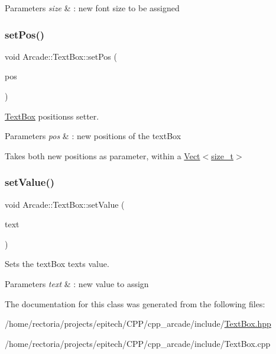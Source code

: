 \begin{DoxyParams}{Parameters}
{\em size} & \+: new font size to be assigned \\
\hline
\end{DoxyParams}
\mbox{\label{class_arcade_1_1_text_box_aec7043b5dc883feed62a8e8eb9dea78d}} 
\subsubsection{\texorpdfstring{set\+Pos()}{setPos()}}
{\footnotesize\ttfamily void Arcade\+::\+Text\+Box\+::set\+Pos (\begin{DoxyParamCaption}\item[{\hyperlink{class_arcade_1_1_vect}{Arcade\+::\+Vect}$<$ size\+\_\+t $>$}]{pos }\end{DoxyParamCaption})}



\hyperlink{class_arcade_1_1_text_box}{Text\+Box} positions\textquotesingle{}s setter. 


\begin{DoxyParams}{Parameters}
{\em pos} & \+: new positions of the text\+Box\\
\hline
\end{DoxyParams}
Takes both new positions as parameter, within a \hyperlink{class_arcade_1_1_vect}{Vect$<$size\+\_\+t$>$} \mbox{\label{class_arcade_1_1_text_box_a195c78d58c25c9f8a810a0ae7450220f}} 
\subsubsection{\texorpdfstring{set\+Value()}{setValue()}}
{\footnotesize\ttfamily void Arcade\+::\+Text\+Box\+::set\+Value (\begin{DoxyParamCaption}\item[{std\+::string const \&}]{text }\end{DoxyParamCaption})}



Sets the text\+Box text\textquotesingle{}s value. 


\begin{DoxyParams}{Parameters}
{\em text} & \+: new value to assign \\
\hline
\end{DoxyParams}


The documentation for this class was generated from the following files\+:\begin{DoxyCompactItemize}
\item 
/home/rectoria/projects/epitech/\+C\+P\+P/cpp\+\_\+arcade/include/\hyperlink{_text_box_8hpp}{Text\+Box.\+hpp}\item 
/home/rectoria/projects/epitech/\+C\+P\+P/cpp\+\_\+arcade/include/Text\+Box.\+cpp\end{DoxyCompactItemize}
